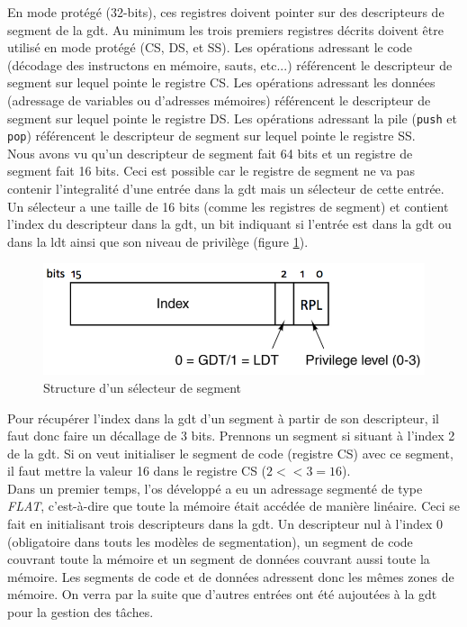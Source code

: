 En mode protégé (32-bits), ces registres doivent pointer sur des descripteurs
de segment de la \acrshort{gdt}. Au minimum les trois premiers registres décrits
doivent être utilisé en mode protégé (CS, DS, et SS). Les opérations adressant le
code (décodage des instructons en mémoire, sauts, etc...) référencent le descripteur
de segment sur lequel pointe le registre CS. Les opérations adressant les données
(adressage de variables ou d'adresses mémoires) référencent le descripteur de segment
sur lequel pointe le registre DS. Les opérations adressant la pile (\texttt{push}
et \texttt{pop}) référencent le descripteur de segment sur lequel pointe
le registre SS. \\

Nous avons vu qu'un descripteur de segment fait 64 bits et un registre de segment
fait 16 bits. Ceci est possible car le registre de segment ne va pas contenir
l'integralité d'une entrée dans la \acrshort{gdt} mais un sélecteur de cette entrée.
Un sélecteur a une taille de 16 bits (comme les registres de segment) et contient
l'index du descripteur dans la \acrshort{gdt}, un bit indiquant si l'entrée est
dans la \acrshort{gdt} ou dans la \acrshort{ldt} ainsi que son niveau de privilège
(figure \ref{seg_sel}).\cite{ref42}

\begin{figure}[!h]
  \centering
  \includegraphics[scale=0.75]{images/seg_sel.png}
  \caption{Structure d'un sélecteur de segment}
  \label{seg_sel}
\end{figure}

Pour récupérer l'index dans la \acrshort{gdt} d'un segment à partir de son descripteur,
il faut donc faire un décallage de 3 bits. Prennons un segment si situant à l'index
2 de la \acrshort{gdt}. Si on veut initialiser le segment de code (registre CS)
avec ce segment, il faut mettre la valeur 16 dans le registre CS ($2 << 3 = 16$). \\

Dans un premier temps, l'\acrshort{os} développé a eu un adressage segmenté de type
\textit{FLAT}, c'est-à-dire que toute la mémoire était accédée de manière linéaire.
Ceci se fait en initialisant trois descripteurs dans la \acrshort{gdt}. Un descripteur
nul à l'index 0 (obligatoire dans touts les modèles de segmentation), un segment
de code couvrant toute la mémoire et un segment de données couvrant aussi toute la mémoire.
Les segments de code et de données adressent donc les mêmes zones de mémoire.
On verra par la suite que d'autres entrées ont été aujoutées à la \acrshort{gdt}
pour la gestion des tâches.

